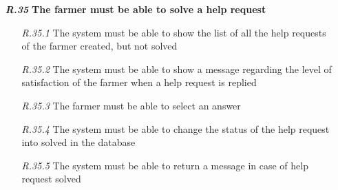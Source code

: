 \begin{itemize}
        \item [\textbf{\textit{R.35}}] \textbf{The farmer must be able to solve a help request}
        \begin{itemize}
            \item [\textit{R.35.1}] The system must be able to show the list of all the help requests of the farmer created, but not solved
	        \item [\textit{R.35.2}] The system must be able to show a message regarding the level of satisfaction of the farmer when a help request is replied
	        \item [\textit{R.35.3}] The farmer must be able to select an answer
	        \item [\textit{R.35.4}] The system must be able to change the status of the help request into solved in the database
	        \item [\textit{R.35.5}] The system must be able to return a message in case of help request solved
        \end{itemize}




\end{itemize}
